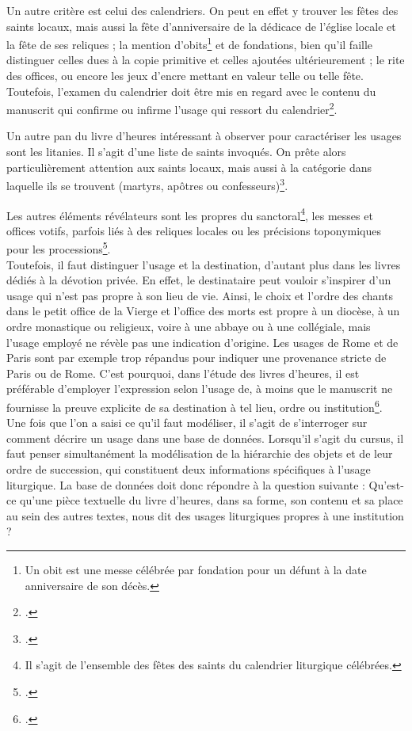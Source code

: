 \documentclass[a4paper,12pt,twoside]{book}
\begin{document}
	Un autre critère est celui des calendriers. On peut en effet y trouver les fêtes des saints locaux, mais aussi la fête d'anniversaire de la dédicace de l'église locale et la fête de ses reliques ; la mention d'obits\footnote{Un obit est une messe célébrée par fondation pour un défunt à la date anniversaire de son décès.} et de fondations, bien qu'il faille distinguer  celles dues à la copie primitive et celles ajoutées ultérieurement ; le rite des offices, ou encore les jeux d'encre mettant en valeur telle ou telle fête. Toutefois, l'examen du calendrier doit être mis en regard avec le contenu du manuscrit qui confirme ou infirme l'usage qui ressort du calendrier\footcite{usages_lit}.
	
	Un autre pan du livre d'heures intéressant à observer pour caractériser les usages sont les litanies. Il s'agit d'une liste de saints invoqués. On prête alors particulièrement attention aux saints locaux, mais aussi à la catégorie dans laquelle ils se trouvent (martyrs, apôtres ou confesseurs)\footcite{usages_lit}. 
	
	Les autres éléments révélateurs sont les propres du sanctoral\footnote{Il s'agit de l'ensemble des fêtes des saints du calendrier liturgique célébrées.}, les messes et offices votifs, parfois liés à des reliques locales ou les précisions toponymiques pour les processions\footcite{usages_lit}. \\
	
	Toutefois, il faut distinguer l'usage et la destination, d'autant plus dans les livres dédiés à la dévotion privée. En effet, le destinataire peut vouloir s'inspirer d'un usage qui n'est pas propre à son lieu de vie. Ainsi, le choix et l'ordre des chants dans le petit office de la Vierge et l'office des morts est propre à un diocèse, à un ordre monastique ou religieux, voire à une abbaye ou à une collégiale, mais l'usage employé ne révèle pas une indication d'origine. Les usages de Rome et de Paris sont par exemple trop répandus pour indiquer une provenance stricte de Paris ou de Rome. C'est pourquoi, dans l'étude des livres d'heures, il est préférable d'employer l'expression \og selon l'usage de\fg{}, à moins que le manuscrit ne fournisse la preuve explicite de sa destination à tel lieu, ordre ou institution\footcite[p. 5]{initiation_man_lit}.\\
	
	Une fois que l'on a saisi ce qu'il faut modéliser, il s'agit de s'interroger sur comment décrire un usage dans une base de données. Lorsqu'il s'agit du cursus, il faut penser simultanément la modélisation de la hiérarchie des objets et de leur ordre de succession, qui constituent deux informations spécifiques à l’usage liturgique. La base de données doit donc répondre à la question suivante : Qu’est-ce qu'une pièce textuelle du livre d’heures, dans sa forme, son contenu et sa place au sein des autres textes, nous dit des usages liturgiques propres à une institution ? \\
	
\end{document}
